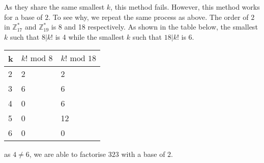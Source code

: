 \begin{enumerate}
As they share the same smallest $k$, this method fails. However, this method works for a base of $2$. To see why, we repeat the same process as above. The order of $2$ in $\mathbb{Z}_{17}^*$ and $\mathbb{Z}_{19}^*$ is 8 and 18 respectively. As shown in the table below, the smallest $k$ such that $8 | k!$ is 4 while the smallest $k$ such that $18 | k!$ is 6. 

\begin{tabular}{l l l}
\hline k & $k! \text{ mod } 8$ & $k! \text{ mod } 18$ \\ \hline
2 & 2 & 2 \\ \hline
3 & 6 & 6 \\ \hline
4 & 0 & 6 \\ \hline
5 & 0 & 12 \\ \hline
6 & 0 & 0 \\ \hline
\end{tabular}

as $4 \neq 6$, we are able to factorise $323$ with a base of $2$.
\end{enumerate}
